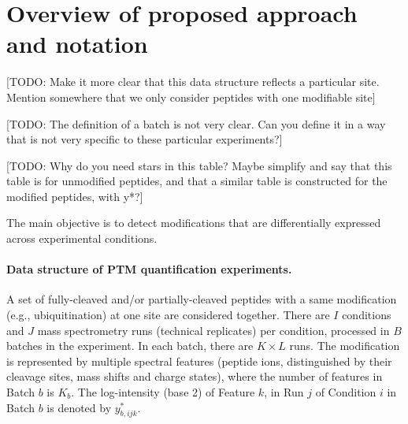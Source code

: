 \documentclass{mcp}
\def\todo#1{{\color{red}[TODO: #1]}}
\begin{document}
\clearpage
\section{Overview of proposed approach and notation}
\label{sec:intro}

\todo{Make it more clear that this data structure reflects a particular site. Mention somewhere that we only consider peptides with one modifiable site}

\todo{The definition of a batch is not very clear. Can you define it in a way that is not very specific to these particular experiments?}

\todo{Why do you need stars in this table? Maybe simplify and say that this table is for unmodified peptides, and that a similar table is constructed for the modified peptides, with y*?}

The main objective is to detect modifications that are differentially expressed across experimental conditions.



\paragraph{Data structure of PTM quantification experiments.}
A set of fully-cleaved and/or partially-cleaved peptides with a same modification (e.g., ubiquitination) at one site are considered together. There are $I$ conditions and $J$ mass spectrometry runs (technical replicates) per condition, processed in $B$ batches in the experiment. In each batch, there are $K \times L$ runs. 
The modification is represented by multiple spectral features (peptide ions, distinguished by their cleavage sites, mass shifts and charge states), where the number of features in Batch $b$ is $K_b$. The log-intensity (base 2) of Feature $k$, in Run $j$ of Condition $i$ in Batch $b$ is denoted by $y_{b,ijk}^{\ast}$. 
\end{document}
